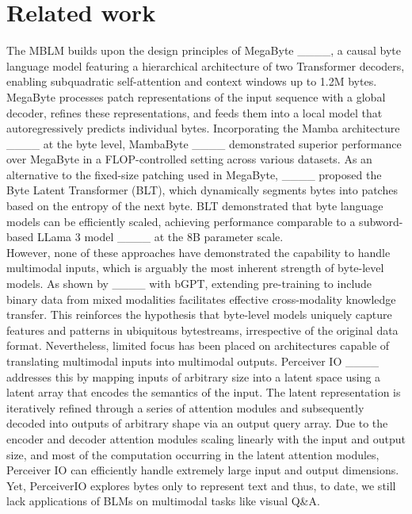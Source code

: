 \section{Related work}
The MBLM builds upon the design principles of MegaByte ____, a causal byte language model featuring a hierarchical architecture of two Transformer decoders, enabling subquadratic self-attention and context windows up to 1.2M bytes. MegaByte processes patch representations of the input sequence with a global decoder, refines these representations, and feeds them into a local model that autoregressively predicts individual bytes. Incorporating the Mamba architecture ____ at the byte level, MambaByte ____ demonstrated superior performance over MegaByte in a FLOP-controlled setting across various datasets. As an alternative to the fixed-size patching used in MegaByte, ____ proposed the Byte Latent Transformer (BLT), which dynamically segments bytes into patches based on the entropy of the next byte. 
BLT demonstrated that byte language models can be efficiently scaled, achieving performance comparable to a subword-based LLama 3 model ____ at the 8B parameter scale.\\
However, none of these approaches have demonstrated the capability to handle multimodal inputs, which is arguably the most inherent strength of byte-level models. As shown by ____ with bGPT, extending pre-training to include binary data from mixed modalities facilitates effective cross-modality knowledge transfer. This reinforces the hypothesis that byte-level models uniquely capture features and patterns in ubiquitous bytestreams, irrespective of the original data format. Nevertheless, limited focus has been placed on architectures capable of translating multimodal inputs into multimodal outputs. Perceiver IO ____ addresses this by mapping inputs of arbitrary size into a latent space using a latent array that encodes the semantics of the input. The latent representation is iteratively refined through a series of attention modules and subsequently decoded into outputs of arbitrary shape via an output query array. Due to the encoder and decoder attention modules scaling linearly with the input and output size, and most of the computation occurring in the latent attention modules, Perceiver IO can efficiently handle extremely large input and output dimensions.
Yet, PerceiverIO explores bytes only to represent text and thus, to date, we still lack applications of BLMs on multimodal tasks like visual Q\&A.